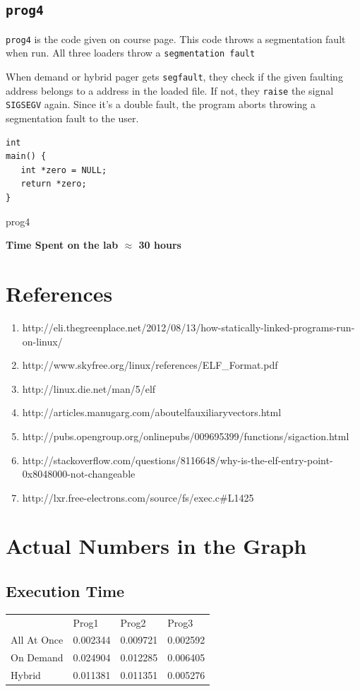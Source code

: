 \documentclass[10pt] {article}
\begin{document}
\subsection{\texttt{prog4}}  
\texttt{prog4} is the code given on course page. This code throws a segmentation fault when run. All three loaders throw a \texttt{segmentation fault}

When demand or hybrid pager gets \texttt{segfault}, they check if the given faulting address belongs to a address in the loaded file. If not, they \texttt{raise} the signal \texttt{SIGSEGV} again. Since it's a double fault, the program aborts throwing a segmentation fault to the user. 

\begin{listing}[ht!]
\begin{verbatim}
int
main() {
   int *zero = NULL;
   return *zero;
}
\end{verbatim}
\label{lst:sched}
\caption{prog4}
\end{listing}

\noindent \textbf{Time Spent on the lab \ensuremath{\approx} 30 hours} 

\section{References}
\begin{enumerate}
  \item http://eli.thegreenplace.net/2012/08/13/how-statically-linked-programs-run-on-linux/
  \item http://www.skyfree.org/linux/references/ELF\_Format.pdf
  \item http://linux.die.net/man/5/elf
  \item http://articles.manugarg.com/aboutelfauxiliaryvectors.html
  \item  http://pubs.opengroup.org/onlinepubs/009695399/functions/sigaction.html
  \item http://stackoverflow.com/questions/8116648/why-is-the-elf-entry-point-0x8048000-not-changeable
  \item http://lxr.free-electrons.com/source/fs/exec.c\#L1425
\end{enumerate}

\section {Actual Numbers in the Graph}

\subsection{Execution Time}
\begin{tabular}{llll}

 & Prog1 & Prog2 & Prog3 \\
All At Once & 0.002344 & 0.009721 & 0.002592 \\
On Demand & 0.024904 & 0.012285 & 0.006405 \\
Hybrid & 0.011381 & 0.011351 & 0.005276 \\
\end{tabular}
\end{document}
